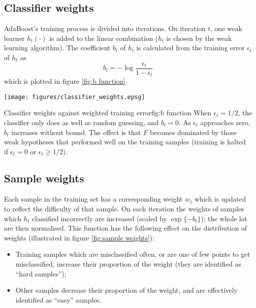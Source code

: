 \subsection{Classifier weights}
\label{sec:classifier weights}

AdaBoost's training process is divided into iterations.  On iteration
$t$, one weak learner $h_t(\cdot)$ is added to the linear
combination ($h_t$ is chosen by the weak learning algorithm).  The
coefficient $b_t$ of $h_t$ is calculated from the 
training error $\epsilon_t$ of $h_t$ as 
%
\begin{equation}
b_t = - \log \frac{\epsilon_t}{1 - \epsilon_t}
\label{eqn:theory:bt}
\end{equation}
%
which is plotted in figure \ref{fig:b function}.

\begin{linefigure}
\begin{center}
\texttt{[image: figures/classifier\_weights.epsg]}
\end{center}
\begin{capt}{Classifier weights against weighted training error}{fig:b
function}
When $\epsilon_t = 1/2$, the classifier only does as well as random
guessing, and $b_t = 0$.  As $\epsilon_t$ approaches zero, $b_t$
increases without bound.  The effect is that $F$ becomes dominated by
those weak hypotheses that performed well on the training samples
(training is halted if $\epsilon_t = 0$ or $\epsilon_t \geq
1/2$).
\end{capt}
\end{linefigure}


\subsection{Sample weights}
\label{sec:sample weights}

Each sample in the training set has a corresponding weight $w_j$ which
is updated to reflect the difficulty of that sample.  On each iteration the
weights of samples which $h_t$ classified incorrectly are increased
(scaled by $\exp \{ -b_t \}$); the whole lot are then normalised.
This function has the following effect on the distribution of weights
(illustrated in figure \ref{fig:sample weights}):

\begin{itemize}
\item	Training samples which are misclassified often, or are one of 
	few points to get misclassified, increase their proportion of
	the weight (they are identified as ``hard samples'');
\item	Other samples decrease their proportion of the weight, and are
	effectively identified as ``easy'' samples.
\end{itemize}

